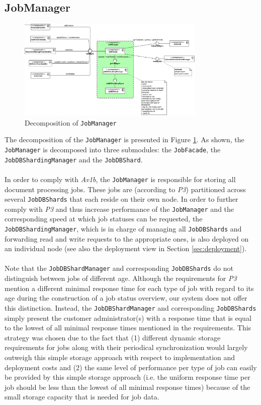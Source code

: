 \documentclass[a4paper,10pt]{article}
\begin{document}
\subsection{JobManager}\label{subsec:decomp-JobManager}
\begin{figure}[!htp]
	\centering
	\includegraphics[width=0.8\textwidth]{JobManager.png}
	\caption{Decomposition of \texttt{JobManager}}
	\label{fig:decomp-JobManager}
\end{figure}
\FloatBarrier
\noindent
The decomposition of the \texttt{JobManager} is presented in Figure \ref{fig:decomp-JobManager}. As shown, the \texttt{JobManager} is decomposed into three submodules: the \texttt{JobFacade}, the \texttt{JobDBShardingManager} and the \texttt{JobDBShard}.\\\\
In order to comply with \textit{Av1b}, the \texttt{JobManager} is responsible for storing all document processing jobs. These jobs are (according to \textit{P3}) partitioned across several \texttt{JobDBShards} that each reside on their own node. In order to further comply with \textit{P3} and thus increase performance of the \texttt{JobManager} and the corresponding speed at which job statuses can be requested, the \texttt{JobDBShardingManager}, which is in charge of managing all \texttt{JobDBShards} and forwarding read and write requests to the appropriate ones, is also deployed on an individual node (see also the deployment view in Section \ref{sec:deployment}).\\\\
Note that the \texttt{JobDBShardManager} and corresponding \texttt{JobDBShards} do not distinguish between jobs of different age. Although the requirements for \textit{P3} mention a different minimal response time for each type of job with regard to its age during the construction of a job status overview, our system does not offer this distinction. Instead, the \texttt{JobDBShardManager} and corresponding \texttt{JobDBShards} simply present the customer administrator(s) with a response time that is equal to the lowest of all minimal response times mentioned in the requirements. This strategy was chosen due to the fact that (1) different dynamic storage requirements for jobs along with their periodical synchronization would largely outweigh this simple storage approach with respect to implementation and deployment costs and (2) the same level of performance per type of job can easily be provided by this simple storage approach (i.e. the uniform response time per job should be less than the lowest of all minimal response times) because of the small storage capacity that is needed for job data.\\\\
\end{document}
